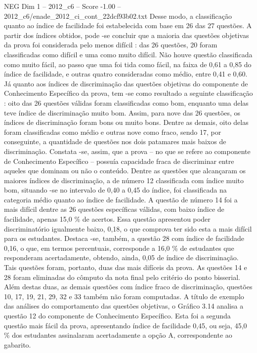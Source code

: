 \begin{textsample}{NEG Dim 1 – 2012\_c6 – Score -1.00 – 2012\_c6/enade\_2012\_ci\_cont\_22dcf93b02.txt}
Desse modo, a classificação quanto ao índice de facilidade foi estabelecida com base em 26 das 27 questões.
A partir dos índices obtidos, pode -se concluir que a maioria das questões objetivas da prova foi considerada pelo menos difícil : das 26 questões, 20 foram classificadas como difícil e uma como muito difícil.
Não houve questão classificada como muito fácil, ao passo que uma foi tida como fácil, na faixa de 0,61 a 0,85 do índice de facilidade, e outras quatro consideradas como médio, entre 0,41 e 0,60.
Já quanto aos índices de discriminação das questões objetivas do componente de Conhecimento Específico da prova, tem -se como resultado a seguinte classificação : oito das 26 questões válidas foram classificadas como bom, enquanto uma delas teve índice de discriminação muito bom.
Assim, para nove das 26 questões, os índices de discriminação foram bons ou muito bons.
Dentre as demais, oito delas foram classificadas como médio e outras nove como fraco, sendo 17, por conseguinte, a quantidade de questões nos dois patamares mais baixos de discriminação.
Constata -se, assim, que a prova – no que se refere ao componente de Conhecimento Específico – possuía capacidade fraca de discriminar entre aqueles que dominam ou não o conteúdo.
Dentre as questões que alcançaram os maiores índices de discriminação, a de número 12 classificada com índice muito bom, situando -se no intervalo de 0,40 a 0,45 do índice, foi classificada na categoria médio quanto ao índice de facilidade.
A questão de número 14 foi a mais difícil dentre as 26 questões específicas válidas, com baixo índice de facilidade, apenas 15,0 \% de acertos.
Essa questão apresentou poder discriminatório igualmente baixo, 0,18, o que comprova ter sido esta a mais difícil para os estudantes.
Destaca -se, também, a questão 28 com índice de facilidade 0,16, o que, em termos percentuais, corresponde a 16,0 \% de estudantes que responderam acertadamente, obtendo, ainda, 0,05 de índice de discriminação.
Tais questões foram, portanto, duas das mais difíceis da prova.
As questões 14 e 28 foram eliminadas do cômputo da nota final pelo critério do ponto bisserial.
Além destas duas, as demais questões com índice fraco de discriminação, questões 10, 17, 19, 21, 29, 32 e 33 também não foram computadas.
A título de exemplo das análises do comportamento das questões objetivas, o Gráfico 3.14 analisa a questão 12 do componente de Conhecimento Específico.
Esta foi a segunda questão mais fácil da prova, apresentando índice de facilidade 0,45, ou seja, 45,0 \% dos estudantes assinalaram acertadamente a opção A, correspondente ao gabarito.

\end{textsample}

